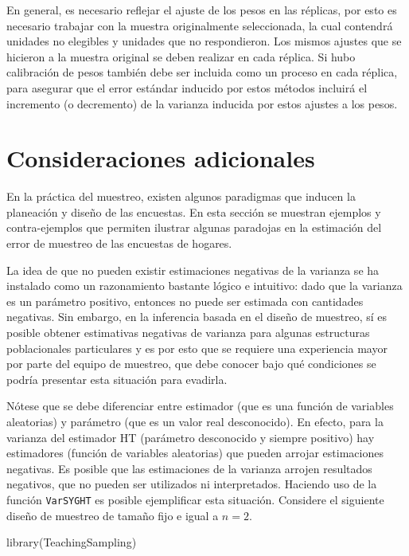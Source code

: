 \documentclass[
  10pt,
  spanish,
]{book}
\newenvironment{Shaded}{\begin{snugshade}}{\end{snugshade}}
\newcommand{\FunctionTok}[1]{\textcolor[rgb]{0.00,0.00,0.00}{#1}}
\newcommand{\NormalTok}[1]{#1}
\begin{document}
En general, es necesario reflejar el ajuste de los pesos en las réplicas, por esto es necesario trabajar con la muestra originalmente seleccionada, la cual contendrá unidades no elegibles y unidades que no respondieron. Los mismos ajustes que se hicieron a la muestra original se deben realizar en cada réplica. Si hubo calibración de pesos también debe ser incluida como un proceso en cada réplica, para asegurar que el error estándar inducido por estos métodos incluirá el incremento (o decremento) de la varianza inducida por estos ajustes a los pesos.

\hypertarget{consideraciones-adicionales}{%
\section{Consideraciones adicionales}\label{consideraciones-adicionales}}

En la práctica del muestreo, existen algunos paradigmas que inducen la planeación y diseño de las encuestas. En esta sección se muestran ejemplos y contra-ejemplos que permiten ilustrar algunas paradojas en la estimación del error de muestreo de las encuestas de hogares.

La idea de que no pueden existir estimaciones negativas de la varianza se ha instalado como un razonamiento bastante lógico e intuitivo: dado que la varianza es un parámetro positivo, entonces no puede ser estimada con cantidades negativas. Sin embargo, en la inferencia basada en el diseño de muestreo, sí es posible obtener estimativas negativas de varianza para algunas estructuras poblacionales particulares y es por esto que se requiere una experiencia mayor por parte del equipo de muestreo, que debe conocer bajo qué condiciones se podría presentar esta situación para evadirla.

Nótese que se debe diferenciar entre estimador (que es una función de variables aleatorias) y parámetro (que es un valor real desconocido). En efecto, para la varianza del estimador HT (parámetro desconocido y siempre positivo) hay estimadores (función de variables aleatorias) que pueden arrojar estimaciones negativas. Es posible que las estimaciones de la varianza arrojen resultados negativos, que no pueden ser utilizados ni interpretados. Haciendo uso de la función \texttt{VarSYGHT} es posible ejemplificar esta situación. Considere el siguiente diseño de muestreo de tamaño fijo e igual a \(n=2\).

\begin{Shaded}
\begin{Highlighting}[]
\FunctionTok{library}\NormalTok{(TeachingSampling)}
\end{Highlighting}
\end{Shaded}
\end{document}
